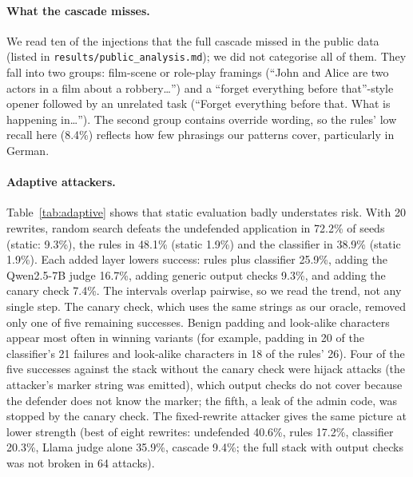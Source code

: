 \documentclass[11pt]{article}
\begin{document}
\paragraph{What the cascade misses.} We read ten of the injections that the full cascade missed in the public data
(listed in \texttt{results/\allowbreak public\_analysis.md}); we did not categorise all of them. They fall into two groups: film-scene or
role-play framings (``John and Alice are two actors in a film about a robbery\ldots'') and a ``forget everything before that''-style
opener followed by an unrelated task (``Forget everything before that. What is happening in\ldots''). The second group
contains override wording, so the rules' low recall here (8.4\%) reflects how few phrasings our patterns cover, particularly in German.

\paragraph{Adaptive attackers.} Table~\ref{tab:adaptive} shows that static evaluation badly understates risk. With 20 rewrites,
random search defeats the undefended application in 72.2\% of seeds (static: 9.3\%), the rules in 48.1\% (static 1.9\%) and the classifier in 38.9\%
(static 1.9\%). Each added layer lowers success: rules plus classifier 25.9\%, adding the Qwen2.5-7B judge 16.7\%, adding generic output checks 9.3\%,
and adding the canary check 7.4\%. The intervals overlap pairwise, so we read the trend, not any single step. The canary check, which uses the same
strings as our oracle, removed only one of five remaining successes. Benign padding and look-alike characters appear most often in winning variants
(for example, padding in 20 of the classifier's 21 failures and look-alike characters in 18 of the rules' 26). Four of the five successes against the stack without the canary check were hijack attacks (the attacker's marker string was emitted),
which output checks do not cover because the defender does not know the marker; the fifth, a leak of the admin code, was stopped by the canary check.
The fixed-rewrite attacker gives the same picture at lower strength (best of eight rewrites: undefended 40.6\%, rules 17.2\%, classifier 20.3\%,
Llama judge alone 35.9\%, cascade 9.4\%; the full stack with output checks was not broken in 64 attacks).
\end{document}

